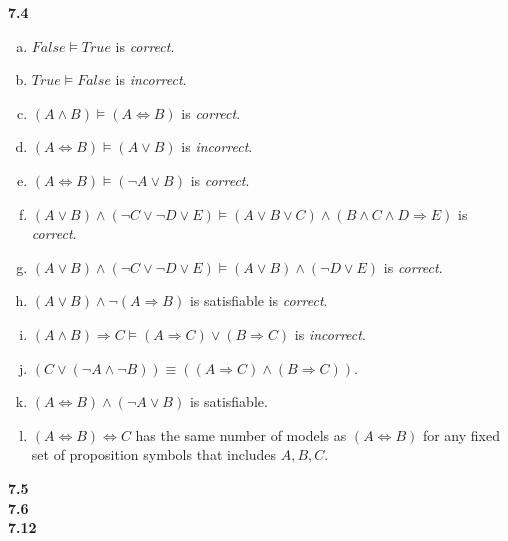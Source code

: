 \documentclass{scrartcl}
\begin{document}
\textbf{7.4}
\begin{enumerate}[(a)]
    \item $False \models True$ is \emph{correct}.
    \item $True \models False$ is \emph{incorrect}.
    \item $(A \land B) \models (A \Leftrightarrow B)$ is \emph{correct}.
    \item $(A \Leftrightarrow B) \models (A \lor B)$ is \emph{incorrect}.
    \item $(A \Leftrightarrow B) \models (\neg A \lor B)$ is \emph{correct}.
    \item $(A \lor B) \land (\neg C \lor \neg D \lor E) \models (A \lor B \lor C) \land (B \land C
        \land D \Rightarrow E)$ is \emph{correct}.
    \item $(A \lor B) \land (\neg C \lor \neg D \lor E) \models (A \lor B) \land (\neg D \lor E)$ is
        \emph{correct}.
    \item $(A \lor B) \land \neg(A \Rightarrow B)$ is satisfiable is \emph{correct}.
    \item $(A \land B) \Rightarrow C \models (A \Rightarrow C) \lor (B \Rightarrow C)$ is
        \emph{incorrect}.
    \item $(C \lor (\neg A \land \neg B)) \equiv ((A \Rightarrow C) \land (B \Rightarrow C))$.
    \item $(A \Leftrightarrow B) \land (\neg A \lor B)$ is satisfiable.
    \item $(A \Leftrightarrow B) \Leftrightarrow C$ has the same number of models as $(A
        \Leftrightarrow B)$ for any fixed set of proposition symbols that includes $A, B, C$.
\end{enumerate}
\textbf{7.5}\\
\textbf{7.6}\\
\textbf{7.12}
\end{document}
